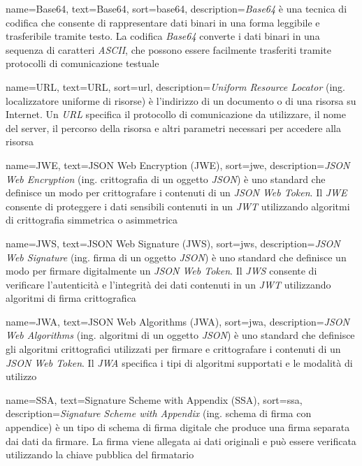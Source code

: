  {
    name=Base64,
    text=Base64,
    sort=base64,
    description={\emph{Base64} è una tecnica di codifica che consente di rappresentare dati binari in una forma leggibile e trasferibile tramite testo. La codifica \emph{Base64} converte i dati binari in una sequenza di caratteri \emph{ASCII}, che possono essere facilmente trasferiti tramite protocolli di comunicazione testuale}
}

 {
    name=URL,
    text=URL,
    sort=url,
    description={\emph{Uniform Resource Locator} (ing. localizzatore uniforme di risorse) è l'indirizzo di un documento o di una risorsa su Internet. Un \emph{URL} specifica il protocollo di comunicazione da utilizzare, il nome del server, il percorso della risorsa e altri parametri necessari per accedere alla risorsa}
}

 {
    name=JWE,
    text=JSON Web Encryption (JWE),
    sort=jwe,
    description={\emph{JSON Web Encryption} (ing. crittografia di un oggetto \emph{JSON}) è uno standard che definisce un modo per crittografare i contenuti di un \emph{JSON Web Token}. Il \emph{JWE} consente di proteggere i dati sensibili contenuti in un \emph{JWT} utilizzando algoritmi di crittografia simmetrica o asimmetrica}
}

 {
    name=JWS,
    text=JSON Web Signature (JWS),
    sort=jws,
    description={\emph{JSON Web Signature} (ing. firma di un oggetto \emph{JSON}) è uno standard che definisce un modo per firmare digitalmente un \emph{JSON Web Token}. Il \emph{JWS} consente di verificare l'autenticità e l'integrità dei dati contenuti in un \emph{JWT} utilizzando algoritmi di firma crittografica}
}

 {
    name=JWA,
    text=JSON Web Algorithms (JWA),
    sort=jwa,
    description={\emph{JSON Web Algorithms} (ing. algoritmi di un oggetto \emph{JSON}) è uno standard che definisce gli algoritmi crittografici utilizzati per firmare e crittografare i contenuti di un \emph{JSON Web Token}. Il \emph{JWA} specifica i tipi di algoritmi supportati e le modalità di utilizzo}
}

 {
    name=SSA,
    text=Signature Scheme with Appendix (SSA),
    sort=ssa,
    description={\emph{Signature Scheme with Appendix} (ing. schema di firma con appendice) è un tipo di schema di firma digitale che produce una firma separata dai dati da firmare. La firma viene allegata ai dati originali e può essere verificata utilizzando la chiave pubblica del firmatario}
}

